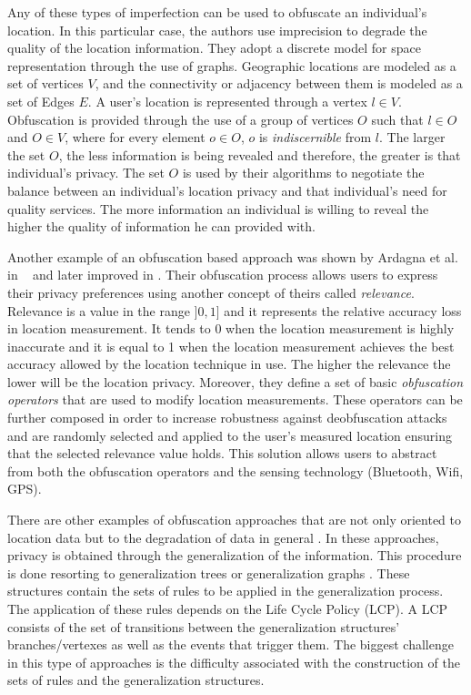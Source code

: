 Any of these types of imperfection can be used to obfuscate an
individual's location. In this particular case, the authors use
imprecision to degrade the quality of the location information.
They adopt a discrete model for space representation through the use of
graphs. Geographic locations are modeled as a set of vertices $V$, and
the connectivity or adjacency between them is modeled as a set of
Edges $E$. A user's location is represented through a
vertex $l \in V$. Obfuscation is provided through the use of a group
of vertices $O$ such that $l \in O$ and $O \in V$, where for every
element $o \in O$, $o$ is \emph{indiscernible} from $l$. The larger
the set $O$, the less information is being revealed and therefore, the
greater is that individual's privacy. The set $O$ is used by their
algorithms to negotiate the balance between an individual's location
privacy and that individual's need for quality services. The more
information an individual is willing to reveal the higher the quality
of information he can provided with.

Another example of an obfuscation based approach was shown by
Ardagna et al. in ~\cite{ardagna2007middleware} and later improved in
\cite{ardagna2007location, ardagna2011obfuscation}. Their obfuscation
process allows users to express their privacy preferences using
another concept of theirs called \emph{relevance}. Relevance is a
value in the range $]0,1]$ and it represents the relative accuracy
loss in location measurement. It tends to 0 when the location
measurement is highly inaccurate and it is equal to 1 when the
location measurement achieves the best accuracy allowed by the
location technique in use. The higher the relevance the lower will be the
location privacy. Moreover, they define a set of basic
\emph{obfuscation operators} that are used to modify location
measurements. These operators can be further composed in order to
increase robustness against deobfuscation attacks and are
randomly selected and applied to the user's measured location ensuring
that the selected relevance value holds. This solution allows users to
abstract from both the obfuscation operators and the sensing
technology (Bluetooth, Wifi, GPS).

There are other examples of obfuscation approaches that are not only
oriented to location data but to the degradation of data in general
\cite{anciaux2008instantdb,heerde2006data}. In these approaches,
privacy is obtained through the generalization of the information.
This procedure is done resorting to generalization trees
\cite{anciaux2008instantdb} or generalization graphs
\cite{heerde2006data}. These structures contain the sets of rules to
be applied in the generalization process. The application of these
rules depends on the Life Cycle Policy (LCP). A LCP consists of the
set of transitions between the generalization structures'
branches/vertexes as well as the events that trigger them. The biggest
challenge in this type of approaches is the difficulty associated with
the construction of the sets of rules and the generalization
structures.

